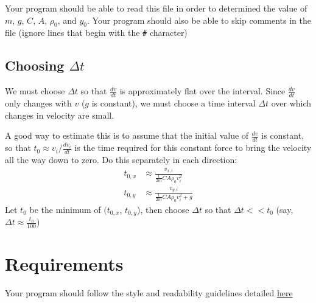 \documentclass{article}
\begin{document}
Your program should be able to read this file in order to determined the value of $m$, $g$, $C$, $A$, $\rho_0$, and $y_0$. Your program should also be able to skip comments in the file (ignore lines that begin with the \texttt{\#} character)
\subsection*{Choosing $\Delta t$}
We must choose $\Delta t$ so that $\frac{dv}{dt}$ is approximately flat over the interval. Since $\frac{dv}{dt}$ only changes with $v$ ($g$ is constant), we must choose a time interval $\Delta t$ over which changes in velocity are small.

A good way to estimate this is to assume that the initial value of $\frac{dv}{dt}$ is constant, so that $t_0\approx v_i/\frac{dv_i}{dt}$ is the time required for this constant force to bring the velocity all the way down to zero. Do this separately in each direction:
\begin{align*}
	t_{0,x}&\approx \frac{v_{x,i}}{\frac{1}{2m}CA\rho_0 v_i^2}\\
	t_{0,y}&\approx \frac{v_{y,i}}{\frac{1}{2m}CA\rho_0 v_i^2+g}
\end{align*}
Let $t_0$ be the minimum of $(t_{0,x}$, $t_{0,y}$), then choose $\Delta t$ so that $\Delta t<<t_0$ (say, $\Delta t\approx \frac{t_0}{100}$)
\section*{Requirements}
Your program should follow the style and readability guidelines detailed \href{https://drive.google.com/file/d/1SFf6Rhv8LydlrUhf85QhMuiZb_IKRS4N/view?usp=sharing}{here}
\end{document}
